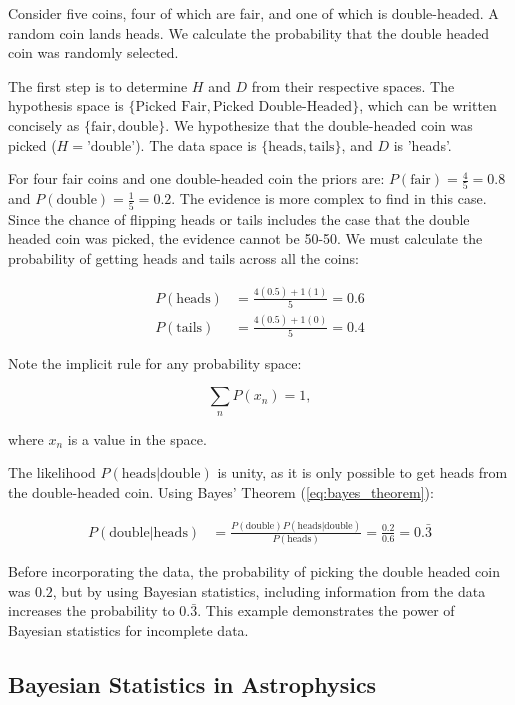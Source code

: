\documentclass[preprint,longauthor]{aastex631}
\numberwithin{equation}{section}
\begin{document}
Consider five coins, four of which are fair, and one of which is double-headed. A random coin lands heads. We calculate the probability that the double headed coin was randomly selected.

The first step is to determine $H$ and $D$ from their respective spaces. The hypothesis space is $\{\text{Picked Fair},\text{Picked Double-Headed}\}$, which can be written concisely as $\{\text{fair},\text{double}\}$. We hypothesize that the double-headed coin was picked ($ H = \text{'double'}$). The data space is $\{\text{heads},\text{tails}\}$, and $D$ is 'heads'.

For four fair coins and one double-headed coin the priors are: $P(\text{fair}) = \frac{4}{5} = 0.8$ and $P(\text{double}) = \frac{1}{5} = 0.2$. The evidence is more complex to find in this case. Since the chance of flipping heads or tails includes the case that the double headed coin was picked, the evidence cannot be 50-50. We must calculate the probability of getting heads and tails across all the coins:

\begin{align*}
  P(\text{heads}) &= \frac{4(0.5)+1(1)}{5} = 0.6 \\
  P(\text{tails}) &= \frac{4(0.5)+1(0)}{5} = 0.4
\end{align*}

Note the implicit rule for any probability space:

\begin{equation}
  \sum_n P(x_n) = 1,
\end{equation}

where $x_n$ is a value in the space.

The likelihood $P(\text{heads}|\text{double})$ is unity, as it is only possible to get heads from the double-headed coin. Using Bayes' Theorem (\autoref{eq:bayes_theorem}):

\begin{align*}
  P(\text{double}|\text{heads}) &= \frac{P(\text{double})P(\text{heads}|\text{double})}{P(\text{heads})} = \frac{0.2}{0.6} = \boxed{0.\bar{3}}
\end{align*}

Before incorporating the data, the probability of picking the double headed coin was $0.2$, but by using Bayesian statistics, including information from the data increases the probability to $0.\bar{3}$. This example demonstrates the power of Bayesian statistics for incomplete data.

\subsection{Bayesian Statistics in Astrophysics}
\end{document}
